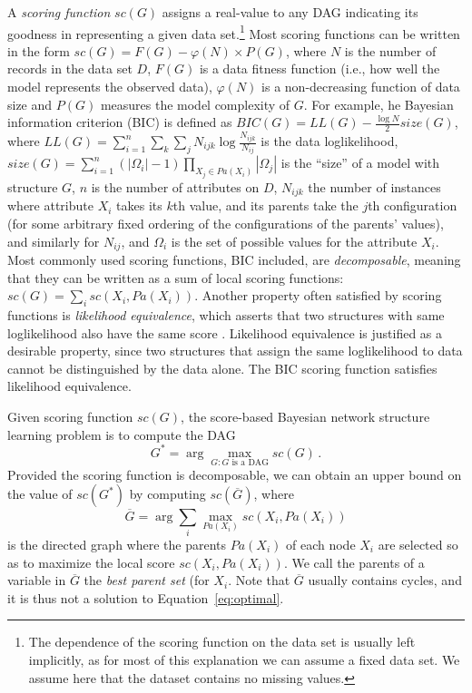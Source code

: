 A \emph{scoring function} ${sc}(G)$ assigns a real-value to any DAG indicating its goodness in representing a given data set.\footnote{The dependence of the scoring function on the data set is usually left implicitly, as for most of this explanation we can assume a fixed data set. We assume here that the dataset contains no missing values.} Most scoring functions can be written in the form
$  {sc}( G ) = F( G ) - \varphi( N ) \times P( G ) $,
where $N$ is the number of records in the data set $D$, $F( G )$ is a data fitness function (i.e., how well the model represents the observed data), $\varphi( N )$ is a non-decreasing function of data size and $P( G )$ measures the model complexity of $G$. For example, he Bayesian information criterion (BIC) is defined as ${BIC}( G ) = {LL}( G ) - \frac{\log N}{2} {size}( G )$, where ${LL}( G ) = \sum_{i=1}^{n} \sum_{k} \sum_{j} N_{ijk} \log \frac{N_{ijk}}{N_{ij}}$ is the data loglikelihood, ${size}( G ) = \sum_{i=1}^{n} ( |\Omega_i| - 1 ) \prod_{X_j \in {Pa}( X_i )} |\Omega_j|$ is the ``size'' of a model with structure $G$, $n$ is the number of attributes on $D$, $N_{ijk}$ the number of instances where attribute $X_i$ takes its $k$th value, and its parents take the $j$th configuration (for some arbitrary fixed ordering of the configurations of the parents' values), and similarly  for $N_{ij}$, and $\Omega_i$ is the set of possible values for the attribute $X_i$.
Most commonly used scoring functions, BIC included, are \emph{decomposable}, meaning that they can be written as a sum of local scoring functions: ${sc}(G)=\sum_i {sc}(X_i, {Pa}(X_i))$. Another property often satisfied by scoring functions is \emph{likelihood equivalence}, which asserts that two structures with same loglikelihood also have the same score \cite{Maxwell04}. Likelihood equivalence is justified as a desirable property, since two structures that assign the same loglikelihood to data cannot be distinguished by the data alone. The BIC scoring function satisfies likelihood equivalence.

Given scoring function ${sc}(G)$, the score-based Bayesian network structure learning problem is to compute the DAG
\begin{equation}
  \label{eq:optimal}
  G^* = \arg\max_{G: G \text{ is a DAG}} {sc}( G ) \, .
\end{equation}
Provided the scoring function is decomposable, we can obtain an upper bound on the value of $sc(G^*)$ by computing $sc(\overline{G})$, where
\begin{equation}
  \label{eq:bestparents}
  \overline{G} = \arg \sum_i \max_{{Pa}(X_i)} sc( X_i, {Pa}( X_i ) ) 
\end{equation}
is the directed graph where the parents ${Pa}( X_i )$ of each node $X_i$ are selected so as to maximize the local score ${sc}( X_i , {Pa}( X_i ) )$. We call the parents of a variable in $\overline{G}$ the \emph{best parent set} (for $X_i$. Note that $\overline{G}$ usually contains cycles, and it is thus not a solution to Equation~\ref{eq:optimal}.

